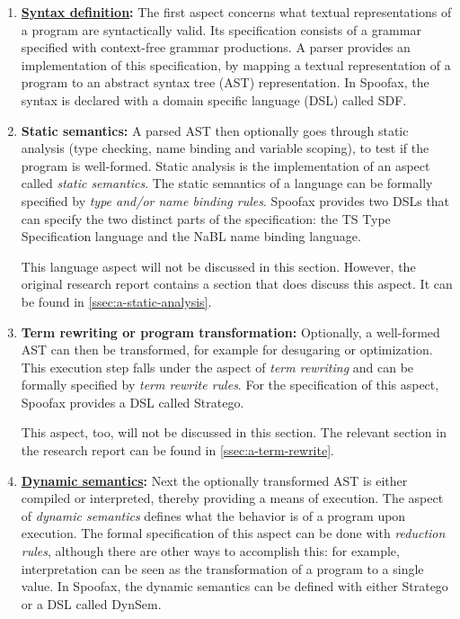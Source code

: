 \begin{enumerate}
\item \textbf{\hyperref[ssec:syntax-def]{Syntax definition}:} The first aspect
  concerns what textual representations of a program are syntactically
  valid. Its specification consists of a grammar specified with context-free
  grammar productions. A parser provides an implementation of this
  specification, by mapping a textual representation of a program to an abstract
  syntax tree (AST) representation. In Spoofax, the syntax is declared with a
  domain specific language (DSL) called SDF.
\item \textbf{Static semantics:} A parsed AST then optionally goes through
  static analysis (type checking, name binding and variable scoping), to test if
  the program is well-formed. Static analysis is the implementation of an aspect
  called \textit{static semantics}. The static semantics of a language can be
  formally specified by \textit{type and/or name binding rules}. Spoofax
  provides two DSLs that can specify the two distinct parts of the
  specification: the TS Type Specification language and the NaBL name binding
  language.

  This language aspect will not be discussed in this section. However, the
  original research report contains a section that does discuss this aspect. It
  can be found in \cref{ssec:a-static-analysis}.
\item \textbf{Term rewriting or program transformation:} Optionally, a
  well-formed AST can then be transformed, for example for desugaring or
  optimization. This execution step falls under the aspect of \textit{term
    rewriting} and can be formally specified by \textit{term rewrite rules}. For
  the specification of this aspect, Spoofax provides a DSL called Stratego.

  This aspect, too, will not be discussed in this section. The relevant section
  in the research report can be found in \cref{ssec:a-term-rewrite}.
\item \textbf{\hyperref[ssec:dynamic-semantics]{Dynamic semantics}:} Next the
  optionally transformed AST is either compiled or interpreted, thereby
  providing a means of execution. The aspect of \textit{dynamic semantics}
  defines what the behavior is of a program upon execution. The formal
  specification of this aspect can be done with \textit{reduction rules},
  although there are other ways to accomplish this: for example, interpretation
  can be seen as the transformation of a program to a single value. In Spoofax,
  the dynamic semantics can be defined with either Stratego or a DSL called
  DynSem.
\end{enumerate}

